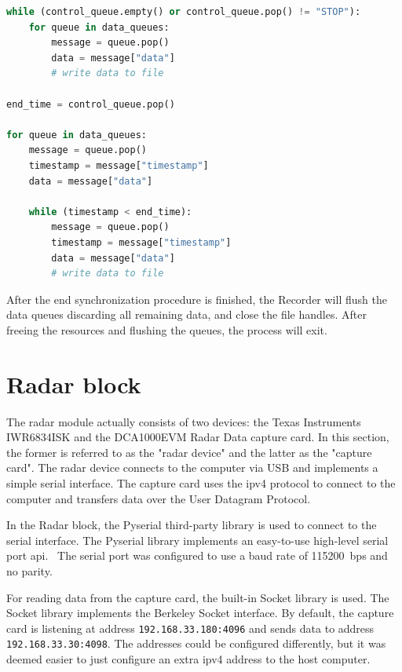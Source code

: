 \begin{lstlisting}[language=Python, caption={End of data synchronization pseudocode.},label={lst:end-synchronization}]
while (control_queue.empty() or control_queue.pop() != "STOP"):
    for queue in data_queues:
        message = queue.pop()
        data = message["data"]
        # write data to file
        
end_time = control_queue.pop()

for queue in data_queues:
    message = queue.pop()
    timestamp = message["timestamp"]
    data = message["data"]
    
    while (timestamp < end_time):
        message = queue.pop()
        timestamp = message["timestamp"]
        data = message["data"]
        # write data to file
\end{lstlisting}

After the end synchronization procedure is finished,
the Recorder will flush the data queues discarding all remaining data,
and close the file handles.
After freeing the resources and flushing the queues, the process will exit.

\section{Radar block}
\label{sec:3-radar}
The radar module actually consists of two devices: the Texas Instruments IWR6834ISK and the DCA1000EVM Radar Data capture card.
In this section, the former is referred to as the "radar device" and the latter as the "capture card".
The radar device connects to the computer via USB and implements a simple serial interface.
The capture card uses the \gls{ipv4} protocol to connect to the computer and transfers data over the User Datagram Protocol.

In the Radar block, the Pyserial third-party library is used to connect to the serial interface.
The Pyserial library implements an easy-to-use high-level serial port \gls{api}.~\cite{python-serial}
The serial port was configured to use a baud rate of 115200~bps and no parity.

For reading data from the capture card, the built-in Socket library is used.
The Socket library implements the Berkeley Socket interface.
By default, the capture card is listening at address \texttt{192.168.33.180:4096} and sends data to address \texttt{192.168.33.30:4098}.
The addresses could be configured differently, but it was deemed easier to just configure an extra \gls{ipv4} address to the host computer.~\cite{dca1000-user-guide}

